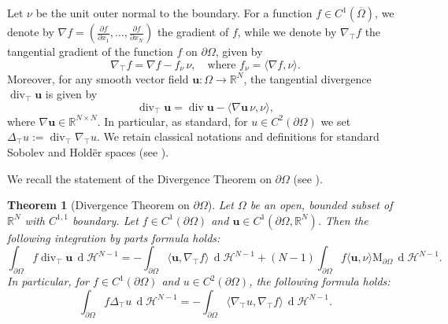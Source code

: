 \documentclass[10pt,a4paper]{amsart}
\numberwithin{equation}{section}
\newcommand{\R}{\mathbb{R}}
\newtheorem{teo}{Theorem}[section]
\renewcommand{\div}{\operatorname{div}}
\renewcommand{\d}[1]{\ensuremath{\operatorname{d}\!{#1}}}
\begin{document}
Let $\nu$  be the unit outer normal to the boundary. For a function $f\in C^1(\overline{\Omega})$, we denote by $\nabla f = \left(\frac{\partial f}{\partial x_1},\dots,\frac{\partial f}{\partial x_N} \right)$ the gradient of $f$, while we denote by $\nabla_\top f$ the tangential gradient of the function $f$ on $\partial \Omega$, given by
\begin{equation*}
\nabla_\top f= \nabla f- f_\nu \, \nu, \quad \text{where } f_\nu = \langle \nabla f, \nu \rangle.
\end{equation*}
Moreover, for any smooth vector field $\mathbf{u} \colon \Omega \to \R^N$, the tangential divergence $\div_{\top} \mathbf{u}$ is given by
\begin{equation*}
\div_{\top} \mathbf{u} =  \div \mathbf{u} - \langle \nabla \mathbf{u} \,\nu , \nu\rangle, 
\end{equation*}
where $\nabla \mathbf{u} \in \R^{N \times N}$. In particular, as standard, for $u \in C^{2}(\partial \Omega)$ we set $\Delta_{\top} u := \div_{\top} \nabla_{\top} u$.
We retain classical notations and definitions for standard Sobolev and Hold\"er spaces (see \cite{gitr83}). 

We recall the statement of the Divergence Theorem on $\partial \Omega$ (see \cite{giusti84,li12,hepi18}).

\begin{teo}[Divergence Theorem on $\partial \Omega$]\label{thm: divergence part Om}
    Let $\Omega$ be an open, bounded subset of $\R^N$ with $C^{1,1}$ boundary. Let $f\in C^1(\partial \Omega) $ and $\mathbf{u} \in C^{1}(\partial \Omega, \R^N)$. Then the following integration by parts formula holds:
    \begin{equation*}
    \int_{\partial \Omega} f \div_{\top} \mathbf{u} \, \d{}\mathcal{H}^{N-1} =-\int_{\partial \Omega} \langle \mathbf{u},\nabla_{\top} f\rangle \, \d{}\mathcal{H}^{N-1} + (N-1)\int_{\partial \Omega} f \langle \mathbf{u},\nu\rangle \mathrm{M}_{\partial\Omega} \, \d{}\mathcal{H}^{N-1}.
    \end{equation*} 
    In particular, for $f\in C^1(\partial \Omega)$ and $u \in C^{2}(\partial \Omega)$, the following formula holds:
    \begin{equation*}
        \int_{\partial \Omega} f \Delta_{\top} u \, \d{}\mathcal{H}^{N-1} =-\int_{\partial \Omega} \langle \nabla_{\top}u,\nabla_{\top} f\rangle \,\d{}\mathcal{H}^{N-1}.
    \end{equation*} 
\end{teo}
\end{document}
